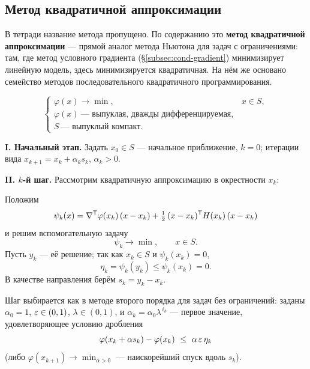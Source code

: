 \subsection{Метод квадратичной аппроксимации}
\label{subsec:quad-approx}

\begin{idea}
В тетради название метода пропущено. По содержанию это \textbf{метод
квадратичной аппроксимации} — прямой аналог метода Ньютона для задач с
ограничениями: там, где метод условного градиента (\S\ref{subsec:cond-gradient})
минимизирует линейную модель, здесь минимизируется квадратичная. На нём же
основано семейство методов последовательного квадратичного программирования.
\end{idea}

\[
  \begin{cases}
    \varphi(x) \to \min , & x \in S , \\
    \varphi(x) \ \text{— выпуклая, дважды дифференцируемая} , \\
    S \ \text{— выпуклый компакт} .
  \end{cases}
\]

\begin{algo}[title={Метод квадратичной аппроксимации}]
\textbf{I. Начальный этап.} Задать $x_0 \in S$ — начальное приближение,
$k = 0$; итерации вида $x_{k+1} = x_k + \alpha_k s_k$, $\alpha_k > 0$.

\medskip
\textbf{II. $k$-й шаг.} Рассмотрим квадратичную аппроксимацию в окрестности
$x_k$:
\begin{steps}
  \item Положим
        \[
          \psi_k(x) = \nabla^{\mathsf{T}}\varphi(x_k)\,(x - x_k)
            + \tfrac{1}{2}\,(x - x_k)^{\mathsf{T}} H(x_k)\,(x - x_k)
        \]
        и решим вспомогательную задачу
        \[
          \psi_k \to \min , \qquad x \in S .
        \]
        Пусть $y_k$ — её решение; так как $x_k \in S$ и $\psi_k(x_k) = 0$,
        \[
          \eta_k = \psi_k(y_k) \le \psi_k(x_k) = 0 .
        \]
        В качестве направления берём $s_k = y_k - x_k$.
  \item Шаг выбирается как в методе второго порядка для задач без ограничений:
        заданы $\alpha_0 = 1$, $\varepsilon \in (0,1)$, $\lambda \in (0,1)$, и
        $\alpha_k = \alpha_0 \lambda^{\,i_k}$ — первое значение, удовлетворяющее
        условию дробления
        \begin{equation}\label{eq:qa-armijo}
          \varphi(x_k + \alpha s_k) - \varphi(x_k) \ \le\ \alpha\,\eps\,\eta_k
        \end{equation}
        (либо $\varphi(x_{k+1}) \to \min_{\alpha > 0}$ — наискорейший спуск
        вдоль $s_k$).
\end{steps}
\end{algo}

